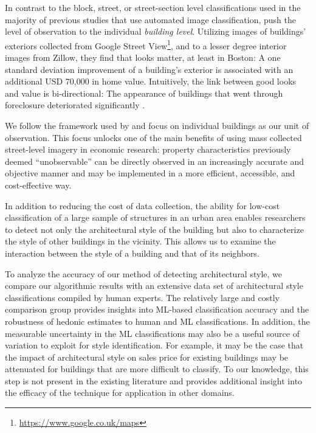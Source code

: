 \documentclass[]{article}
\begin{document}
In contrast to the block, street, or street-section level classifications used in the majority of previous studies that use automated image classification, \textcite{GlaeserKincaidNaik2018} push the level of observation to the individual \emph{building level}. Utilizing images of buildings' exteriors collected from Google Street View\footnote{\href{https://www.google.co.uk/maps}{https://www.google.co.uk/maps}}, and to a lesser degree interior images from Zillow, they find that looks matter, at least in Boston: A one standard deviation improvement of a building's exterior is associated with an additional USD 70,000 in home value. Intuitively, the link between good looks and value is
bi-directional: The appearance of buildings that went through foreclosure deteriorated significantly \autocite{GlaeserKincaidNaik2018}.

We follow the framework used by \textcite{GlaeserKincaidNaik2018} and focus on individual buildings as our unit of observation. This focus unlocks one of the main benefits of using mass collected street-level imagery in economic research: property characteristics previously deemed ``unobservable'' can be directly observed in an increasingly accurate and objective manner and may be implemented in a more efficient, accessible, and cost-effective way. 

In addition to reducing the cost of data collection, the ability for low-cost classification of a large sample of structures in an urban area enables researchers to detect not only the architectural style of the building but also to characterize the style of other buildings in the vicinity. This allows us to examine the interaction between the style of a building and that of its neighbors. 

To analyze the accuracy of our method of detecting architectural style, we compare our algorithmic results with an extensive data set of architectural style classifications compiled by human experts. The relatively large and costly comparison group provides insights into ML-based classification accuracy and the robustness of hedonic estimates to human and ML classifications. In addition, the measurable uncertainty in the ML classifications may also be a useful source of variation to exploit for style identification.  For example, it may be the case that the impact of architectural style on sales price for existing buildings may be attenuated for buildings that are more difficult to classify. To our knowledge, this step is not present in the existing literature and provides additional insight into the efficacy of the technique for application in other domains.
\end{document}
